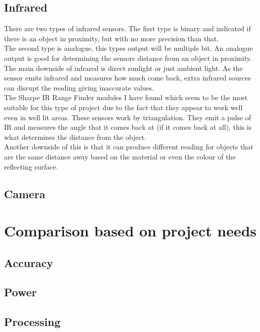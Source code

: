 \documentclass{article}
\begin{document}
\subsection{Infrared}
There are two types of infrared sensors.  The first type is binary and indicated if there is an object in proximity, but with no more precision than that.
\\The second type is analogue, this types output will be multiple bit.  An analogue output is good for determining the sensors distance from an object in proximity.
\\The main downside of infrared is direct sunlight or just ambient light.  As the sensor emits infrared and measures how much come back, extra infrared sources can disrupt the reading giving inaccurate values.
\\The Sharpe IR Range Finder modules I have found which seem to be the most suitable for this type of project due to the fact that they appear to work well even in well lit areas.  These sensors work by triangulation.  They emit a pulse of IR and measures the angle that it comes back at (if it comes back at all), this is what determines the distance from the object.
\\Another downside of this is that it can produce different reading for objects that are the same distance away based on the material or even the colour of the reflecting surface.

\subsection{Camera}


\section{Comparison based on project needs}

\subsection{Accuracy}

\subsection{Power}

\subsection{Processing}



\end{document}
